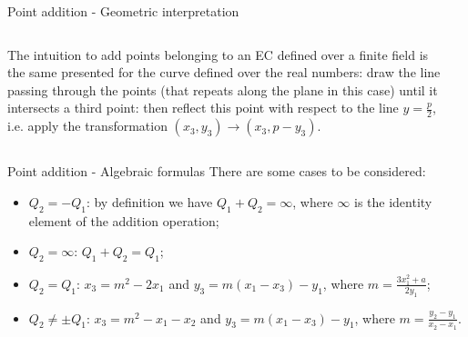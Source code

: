 \documentclass[slidescentered]{beamer}
\newcommand{\backupbegin}{
	\newcounter{framenumberappendix}
	\setcounter{framenumberappendix}{\value{framenumber}}
}
\begin{document}
	\appendix
	\backupbegin
	\begin{frame}{Point addition - Geometric interpretation}
		\begin{columns}
			\begin{column}{0.5\linewidth}
				The intuition to add points belonging to an EC defined over a finite field is the same presented for the curve defined over the real numbers: draw the line passing through the points (that repeats along the plane in this case) until it intersects a third point: then reflect this point with respect to the line $y = \frac{p}{2}$, i.e. apply the transformation $(x_3, y_3) \to (x_3, p - y_3)$.
			\end{column}
			\begin{column}{0.6\linewidth}
			\end{column}
		\end{columns}
	\end{frame}

	\begin{frame}{Point addition - Algebraic formulas}
		There are some cases to be considered:
		\begin{itemize}
			\item $Q_2 = -Q_1$: by definition we have $Q_1 + Q_2 = \infty$, where $\infty$ is the identity element of the addition operation;
			\item $Q_2 = \infty$: $Q_1 + Q_2 = Q_1$;
			\item $Q_2 = Q_1$: $x_3 = m^2 - 2x_1$ and $y_3 = m(x_1 - x_3) - y_1$, where $m = \frac{3x_1^2 + a}{2y_1}$;
			\item $Q_2 \neq \pm Q_1$: $x_3 = m^2 - x_1 - x_2$ and $y_3 = m(x_1 - x_3) - y_1$, where $m = \frac{y_2 - y_1}{x_2 - x_1}$.
		\end{itemize}
	\end{frame}
	
\end{document}
